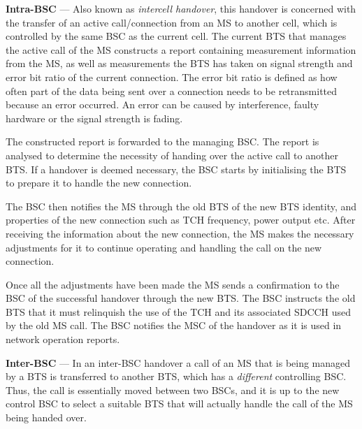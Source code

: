 \begin{description}
\item{\textbf{Intra-BSC}} --- Also known as \emph{intercell handover}, this handover is concerned with the transfer of an active call/connection from an \gls{MS} to another cell, which is controlled by the same \gls{BSC} as the current cell\cite{wirelesstelcoMullet,GSMArchitectureProtocolsServices}. The current \gls{BTS} that manages the active call of the \gls{MS} constructs a report containing measurement information from the MS, as well as measurements the \gls{BTS} has taken on signal strength and error bit ratio of the current connection\cite{wirelesstelcoMullet,GSMArchitectureProtocolsServices}. The error bit ratio is defined as how often part of the data being sent over a connection needs to be retransmitted because an error occurred\cite{wirelesstelcoMullet,GSMArchitectureProtocolsServices}. An error can be caused by interference, faulty hardware or the signal strength is fading\cite{wirelesstelcoMullet,GSMArchitectureProtocolsServices}. 

  The constructed report is forwarded to the managing \gls{BSC}. The report is analysed to determine the necessity of handing over the active call to another \gls{BTS}\@. If a handover is deemed necessary, the \gls{BSC} starts by initialising the \gls{BTS} to prepare it to handle the new connection\cite{wirelesstelcoMullet,GSMArchitectureProtocolsServices}.

The \gls{BSC} then notifies the \gls{MS} through the old \gls{BTS} of the new \gls{BTS} identity, and properties of the new connection such as \gls{TCH} frequency, power output etc. After receiving the information about the new connection, the \gls{MS} makes the necessary adjustments for it to continue operating and handling the call on the new connection\cite{wirelesstelcoMullet,GSMArchitectureProtocolsServices}. 

Once all the adjustments have been made the \gls{MS} sends a confirmation to the \gls{BSC} of the successful handover through the new \gls{BTS}\@. The \gls{BSC} instructs the old \gls{BTS} that it must relinquish the use of the \gls{TCH} and its associated \gls{SDCCH} used by the old \gls{MS} call. The \gls{BSC} notifies the \gls{MSC} of the handover as it is used in network operation reports\cite{wirelesstelcoMullet,GSMArchitectureProtocolsServices}.
\item{\textbf{Inter-BSC}} --- In an inter-\gls{BSC} handover a call of an \gls{MS} that is being managed by a \gls{BTS} is transferred to another \gls{BTS}, which has a \emph{different} controlling \gls{BSC}\@. Thus, the call is essentially moved between two \glspl{BSC}, and it is up to the new control \gls{BSC} to select a suitable \gls{BTS} that will actually handle the call of the \gls{MS} being handed over\cite{wirelesstelcoMullet,GSMArchitectureProtocolsServices}.


\end{description}
